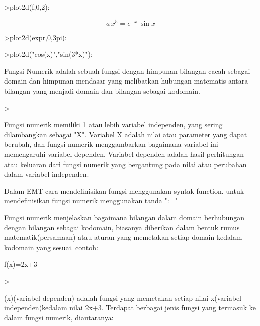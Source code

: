 \documentclass{article}
\begin{document}
\begin{eulernotebook}
\begin{eulercomment}
\begin{eulercomment}
\begin{eulercomment}
\begin{eulercomment}
\begin{euleroutput}
\end{euleroutput}
\begin{eulerprompt}
>plot2d(f,0,2):
\end{eulerprompt}
\begin{eulerformula}
\[
a\,x^5=e^ {- x }\,\sin x
\]
\end{eulerformula}
\begin{eulerprompt}
>plot2d(expr,0,3pi):
\end{eulerprompt}
\begin{eulerprompt}
>plot2d("cos(x)","sin(3*x)"):
\end{eulerprompt}
\begin{eulercomment}
Fungsi Numerik adalah sebuah fungsi dengan himpunan bilangan cacah
sebagai domain dan himpunan mendasar yang melibatkan hubungan
matematis antara bilangan yang menjadi domain dan bilangan sebagai
kodomain.
\end{eulercomment}
\begin{eulerprompt}
> 
\end{eulerprompt}
\begin{eulercomment}
Fungsi numerik  memiliki  1  atau  lebih  variabel  independen, yang
sering dilambangkan sebagai "X". Variabel X adalah nilai atau
parameter yang dapat berubah, dan fungsi numerik menggambarkan
bagaimana variabel ini memengaruhi variabel dependen. Variabel
dependen adalah hasil perhitungan atau keluaran dari fungsi numerik
yang bergantung pada nilai atau perubahan dalam variabel independen.

\end{eulercomment}
\begin{eulercomment}
Dalam EMT cara mendefinisikan fungsi menggunakan syntak function.
untuk mendefinisikan fungsi numerik menggunakan tanda ":="

Fungsi  numerik  menjelaskan bagaimana bilangan  dalam  domain
berhubungan dengan bilangan sebagai kodomain, biasanya diberikan dalam
bentuk rumus matematik(persamaan) atau aturan yang memetakan setiap
domain kedalam kodomain yang sesuai. contoh:

f(x)=2x+3
\end{eulercomment}
\begin{eulerprompt}
> 
\end{eulerprompt}
\begin{eulercomment}
(x)(variabel dependen) adalah fungsi yang memetakan setiap nilai
x(variabel independen)kedalam nilai 2x+3. Terdapat berbagai jenis
fungsi yang termasuk ke dalam fungsi numerik, diantaranya:


\end{eulercomment}
\end{eulercomment}
\end{eulercomment}
\end{eulercomment}
\end{eulercomment}
\end{eulernotebook}
\end{document}
